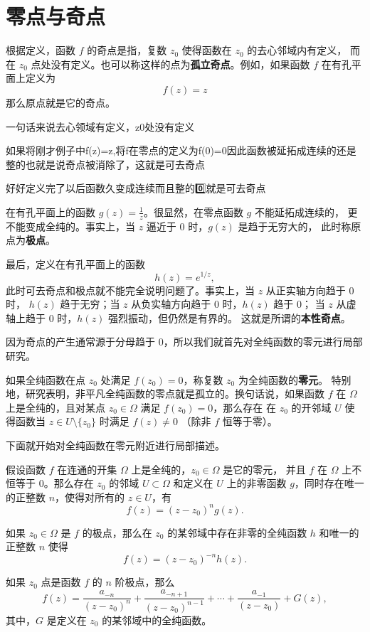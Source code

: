 \documentclass[lang=cn,10pt]{elegantbook}
\begin{document}
\section{零点与奇点}
\begin{definition}
    根据定义，函数 $f$ 的奇点是指，复数 $z_0$ 使得函数在 $z_0$ 的去心邻域内有定义，
而在 $z_0$ 点处没有定义。也可以称这样的点为\textbf{孤立奇点}。例如，如果函数 $f$
在有孔平面上定义为
\[
f(z) = z
\]
那么原点就是它的奇点。
\end{definition}一句话来说去心领域有定义，z0处没有定义
\begin{definition}
 如果将刚才例子中f(z)=z,将f在零点的定义为f(0)=0因此函数被延拓成连续的还是整的也就是说奇点被消除了，这就是可去奇点   
\end{definition}好好定义完了以后函数久变成连续而且整的0️⃣就是可去奇点
\begin{definition}[孤立奇点——极点]
  在有孔平面上的函数 $g(z) = \tfrac{1}{z}$。很显然，在零点函数 $g$ 不能延拓成连续的，
更不能变成全纯的。事实上，当 $z$ 逼近于 $0$ 时，$g(z)$ 是趋于无穷大的，
此时称原点为\textbf{极点}。  
\end{definition}
\begin{definition}
    最后，定义在有孔平面上的函数
\[
h(z) = e^{1/z},
\]
此时可去奇点和极点就不能完全说明问题了。事实上，当 $z$ 从正实轴方向趋于 $0$ 时，
$h(z)$ 趋于无穷；当 $z$ 从负实轴方向趋于 $0$ 时，$h(z)$ 趋于 $0$；
当 $z$ 从虚轴上趋于 $0$ 时，$h(z)$ 强烈振动，但仍然是有界的。
这就是所谓的\textbf{本性奇点}。
\end{definition}
\begin{definition}[零元]
 因为奇点的产生通常源于分母趋于 $0$，所以我们就首先对全纯函数的零元进行局部研究。

如果全纯函数在点 $z_0$ 处满足 $f(z_0)=0$，称复数 $z_0$ 为全纯函数的\textbf{零元}。
特别地，研究表明，非平凡全纯函数的零点就是孤立的。换句话说，如果函数 $f$
在 $\Omega$ 上是全纯的，且对某点 $z_0 \in \Omega$ 满足 $f(z_0)=0$，那么存在
在 $z_0$ 的开邻域 $U$ 使得函数当 $z \in U \setminus \{z_0\}$ 时满足 $f(z)\neq 0$
（除非 $f$ 恒等于零）。

下面就开始对全纯函数在零元附近进行局部描述。   
\end{definition}
\begin{theorem}[1.1]
假设函数 $f$ 在连通的开集 $\Omega$ 上是全纯的，$z_0 \in \Omega$ 是它的零元，
并且 $f$ 在 $\Omega$ 上不恒等于 $0$。那么存在 $z_0$ 的邻域 $U \subset \Omega$ 
和定义在 $U$ 上的非零函数 $g$，同时存在唯一的正整数 $n$，使得对所有的 
$z \in U$，有
\[
f(z) = (z - z_0)^n g(z).
\]
\end{theorem}
\begin{theorem}[1.2]
如果 $z_0 \in \Omega$ 是 $f$ 的极点，那么在 $z_0$ 的某邻域中存在非零的全纯函数 $h$ 
和唯一的正整数 $n$ 使得
\[
f(z) = (z - z_0)^{-n} h(z).
\]
\end{theorem}
\begin{theorem}[1.3]
如果 $z_0$ 点是函数 $f$ 的 $n$ 阶极点，那么
\[
f(z) = \frac{a_{-n}}{(z-z_0)^n}
      + \frac{a_{-n+1}}{(z-z_0)^{n-1}}
      + \cdots
      + \frac{a_{-1}}{(z-z_0)}
      + G(z),
\tag{1}
\]
其中，$G$ 是定义在 $z_0$ 的某邻域中的全纯函数。
\end{theorem}
\end{document}
